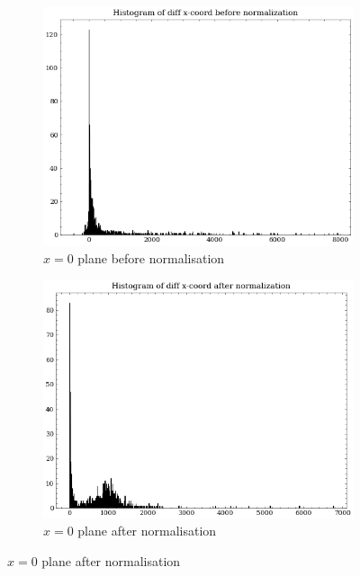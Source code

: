 \begin{figure}[H]
    \centering
    \begin{subfigure}[b]{0.45\textwidth}
        \centering
        \includegraphics[width=\textwidth]{assets/preprocessing/Histogram_of_diff_x-coord_before_normalization.png}
        \caption{$x=0$ plane before normalisation}
        \label{fig:resampling-flipping-x-before}
    \end{subfigure}
    \hfill
    \begin{subfigure}[b]{0.45\textwidth}
        \centering
        \includegraphics[width=\textwidth]{assets/preprocessing/Histogram_of_diff_x-coord_after_normalization.png}
        \caption{$x=0$ plane after normalisation}
        \label{fig:resampling-flipping-x-after}
    \end{subfigure}
    

\end{figure}
